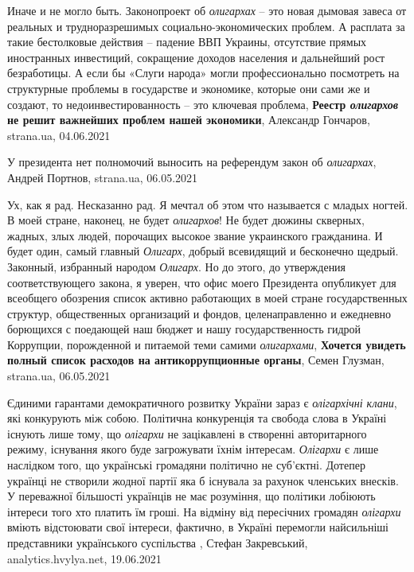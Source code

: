 Иначе и не могло быть. Законопроект об \emph{олигархах} – это новая дымовая
завеса от реальных и трудноразрешимых социально-экономических проблем. А
расплата за такие бестолковые действия – падение ВВП Украины, отсутствие прямых
иностранных инвестиций, сокращение доходов населения и дальнейший рост
безработицы. А если бы «Слуги народа» могли профессионально посмотреть на
структурные проблемы в государстве и экономике, которые они сами же и создают,
то недоинвестированность – это ключевая проблема,
\textbf{Реестр \emph{олигархов} не решит важнейших проблем нашей экономики},
Александр Гончаров, strana.ua, 04.06.2021

У президента нет полномочий выносить на референдум закон об \emph{олигархах},
Андрей Портнов, strana.ua, 06.05.2021

Ух, как я рад. Несказанно рад. Я мечтал об этом что называется с младых ногтей.
В моей стране, наконец, не будет \emph{олигархов}! Не будет дюжины скверных, жадных,
злых людей, порочащих высокое звание украинского гражданина. И будет один,
самый главный \emph{Олигарх}, добрый всевидящий и бесконечно щедрый. Законный,
избранный народом \emph{Олигарх}.  Но до этого, до утверждения соответствующего
закона, я уверен, что офис моего Президента опубликует для всеобщего обозрения
список активно работающих в моей стране государственных структур, общественных
организаций и фондов, целенаправленно и ежедневно борющихся с поедающей наш
бюджет и нашу государственность гидрой Коррупции, порожденной и питаемой теми
самими \emph{олигархами},
\textbf{Хочется увидеть полный список расходов на антикоррупционные органы},
Семен Глузман, strana.ua, 06.05.2021


Єдиними гарантами демократичного розвитку України зараз є \emph{олігархічні клани},
які конкурують між собою. Політична конкуренція та свобода слова в Україні
існують лише тому, що \emph{олігархи} не зацікавлені в створенні авторитарного
режиму, існування якого буде загрожувати їхнім інтересам. \emph{Олігархи} є лише
наслідком того, що українські громадяни політично не суб’єктні. Дотепер
українці не створили жодної партії яка б існувала за рахунок членських
внесків. У переважної більшості українців не має розуміння, що політики
лобіюють інтереси того хто платить їм гроші. На відміну від пересічних
громадян \emph{олігархи} вміють відстоювати свої інтереси, фактично, в Україні
перемогли найсильніші представники українського суспільства
, Стефан Закревський, 
analytics.hvylya.net, 19.06.2021


